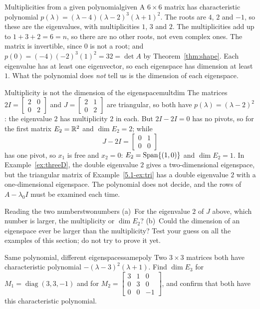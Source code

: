 \documentclass[11pt]{article}
\begin{document}
\begin{exmp}{Multiplicities from a given polynomial}{given}
A $6\times6$ matrix has characteristic polynomial $p(\lambda)=(\lambda-4)(\lambda-2)^3(\lambda+1)^2$. The roots are $4$, $2$ and $-1$, so these are the eigenvalues, with multiplicities $1$, $3$ and $2$. The multiplicities add up to $1+3+2=6=n$, so there are no other roots, not even complex ones. The matrix is invertible, since $0$ is not a root; and $p(0)=(-4)(-2)^3(1)^2=32=\det A$ by Theorem~\ref{thm:shape}. Each eigenvalue has at least one eigenvector, so each eigenspace has dimension at least $1$. What the polynomial does \emph{not} tell us is the dimension of each eigenspace.
\end{exmp}

\begin{exmp}{Multiplicity is not the dimension of the eigenspace}{multdim}
The matrices $2I=\begin{bmatrix}2&0\\0&2\end{bmatrix}$ and $J=\begin{bmatrix}2&1\\0&2\end{bmatrix}$ are triangular, so both have $p(\lambda)=(\lambda-2)^2$: the eigenvalue $2$ has multiplicity $2$ in each. But $2I-2I=0$ has no pivots, so for the first matrix $E_2=\mathbb{R}^2$ and $\dim E_2=2$; while
\[
J-2I=\begin{bmatrix}0&1\\0&0\end{bmatrix}
\]
has one pivot, so $x_1$ is free and $x_2=0$: $E_2=\operatorname{Span}\{(1,0)\}$ and $\dim E_2=1$. In Example~\ref{ex:threeD}, the double eigenvalue $2$ gives a two-dimensional eigenspace, but the triangular matrix of Example~\ref{5.1-ex:tri} has a double eigenvalue $2$ with a one-dimensional eigenspace. The polynomial does not decide, and the rows of $A-\lambda_0I$ must be examined each time.
\end{exmp}

\begin{think}{Reading the two numbers}{twonumbers}
(a)~For the eigenvalue $2$ of $J$ above, which number is larger, the multiplicity or $\dim E_2$? (b)~Could the dimension of an eigenspace ever be larger than the multiplicity? Test your guess on all the examples of this section; do not try to prove it yet.
\end{think}

\begin{kc}{Same polynomial, different eigenspaces}{samepoly}
Two $3\times3$ matrices both have characteristic polynomial $-(\lambda-3)^2(\lambda+1)$. Find $\dim E_3$ for $M_1=\operatorname{diag}(3,3,-1)$ and for $M_2=\begin{bmatrix}3&1&0\\0&3&0\\0&0&-1\end{bmatrix}$, and confirm that both have this characteristic polynomial.
\end{kc}
\end{document}
